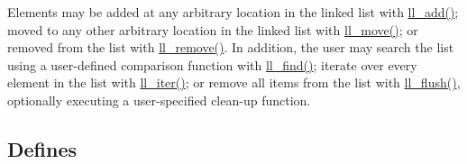 Elements may be added at any arbitrary location in the linked list with \hyperlink{group__dbprim__link_a6}{ll\_\-add()}; moved to any other arbitrary location in the linked list with \hyperlink{group__dbprim__link_a7}{ll\_\-move()}; or removed from the list with \hyperlink{group__dbprim__link_a8}{ll\_\-remove()}. In addition, the user may search the list using a user-defined comparison function with \hyperlink{group__dbprim__link_a9}{ll\_\-find()}; iterate over every element in the list with \hyperlink{group__dbprim__link_a10}{ll\_\-iter()}; or remove all items from the list with \hyperlink{group__dbprim__link_a11}{ll\_\-flush()}, optionally executing a user-specified clean-up function. \subsection*{Defines}
